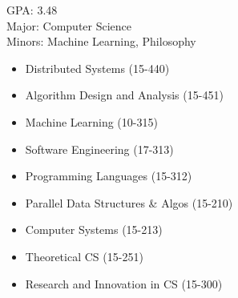 \documentclass[10pt,a4paper,ragged2e,withhyper]{altacv}
\begin{document}
\begin{paracol}{2}
\medskip


\switchcolumn


GPA: 3.48 \\
Major: Computer Science \\
Minors: Machine Learning, Philosophy


\begin{itemize}
\item Distributed Systems (15-440)
\item Algorithm Design and Analysis (15-451)
\item Machine Learning (10-315)
\item Software Engineering (17-313)
\item Programming Languages (15-312)
\item Parallel Data Structures \& Algos (15-210)
\item Computer Systems (15-213)
\item Theoretical CS (15-251)
\end{itemize}


\begin{itemize}
\item Research and Innovation in CS (15-300)
\end{itemize}


 \\

\divider

\cvtag{\LaTeX}

\divider




\end{paracol}
\end{document}
